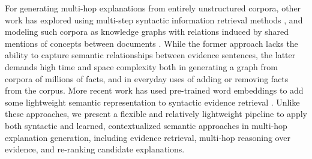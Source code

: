 \documentclass[letterpaper]{article} %
\begin{document}
For generating multi-hop explanations from entirely unstructured corpora, other work has explored using multi-step syntactic information retrieval methods \cite{jhamtani-clark-2020-learning}, and modeling such corpora as knowledge graphs with relations induced by shared mentions of concepts between documents \cite{dhingra2020differentiable,lin-etal-2021-differentiable}. While the former approach lacks the ability to capture semantic relationships between evidence sentences, the latter demands high time and space complexity both in generating a graph from corpora of millions of facts, and in everyday uses of adding or removing facts from the corpus.
More recent work has used pre-trained word embeddings to add some lightweight semantic representation to syntactic evidence retrieval \cite{yadav-etal-2021-want}.
Unlike these approaches, we present a flexible and relatively lightweight pipeline to apply both syntactic and learned, contextualized semantic approaches in multi-hop explanation generation, including evidence retrieval, multi-hop reasoning over evidence, and re-ranking candidate explanations.



\end{document}
